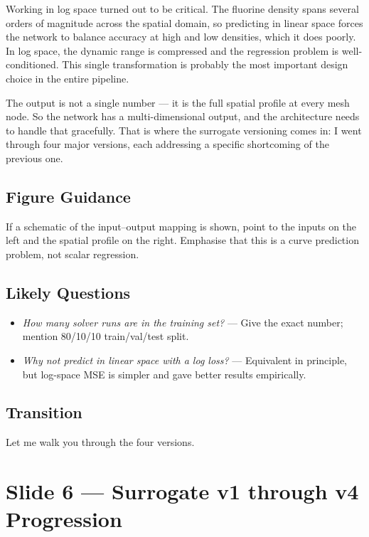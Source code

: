 \documentclass[12pt,a4paper]{article}
\begin{document}
Working in log space turned out to be critical. The fluorine density
spans several orders of magnitude across the spatial domain, so
predicting in linear space forces the network to balance accuracy at
high and low densities, which it does poorly. In log space, the
dynamic range is compressed and the regression problem is
well-conditioned. This single transformation is probably the most
important design choice in the entire pipeline.

The output is not a single number --- it is the full spatial profile
at every mesh node. So the network has a multi-dimensional output,
and the architecture needs to handle that gracefully. That is where
the surrogate versioning comes in: I went through four major versions,
each addressing a specific shortcoming of the previous one.

\subsection*{Figure Guidance}
If a schematic of the input--output mapping is shown, point to the
inputs on the left and the spatial profile on the right. Emphasise
that this is a curve prediction problem, not scalar regression.

\subsection*{Likely Questions}
\begin{itemize}
  \item \emph{How many solver runs are in the training set?}
    --- Give the exact number; mention 80/10/10 train/val/test split.
  \item \emph{Why not predict in linear space with a log loss?}
    --- Equivalent in principle, but log-space MSE is simpler and
    gave better results empirically.
\end{itemize}

\subsection*{Transition}
Let me walk you through the four versions.

\clearpage

\section{Slide 6 --- Surrogate v1 through v4 Progression}
\label{sec:slide6}
\end{document}
